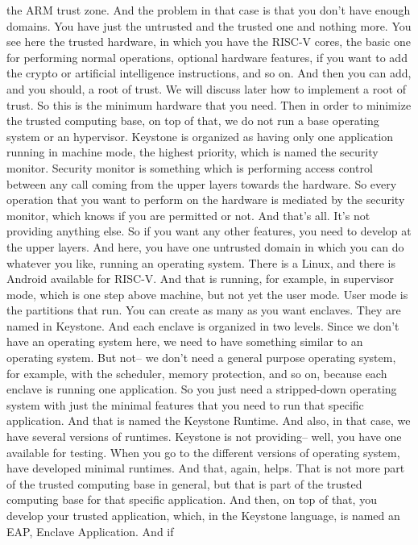  the ARM trust zone. And the problem in that case is that you don't have enough
 domains. You have just the untrusted and the trusted one and nothing more. You
 see here the trusted hardware, in which you have the RISC-V cores, the basic
 one for performing normal operations, optional hardware features, if you want
 to add the crypto or artificial intelligence instructions, and so on. And then
 you can add, and you should, a root of trust. We will discuss later how to
 implement a root of trust. So this is the minimum hardware that you need. Then
 in order to minimize the trusted computing base, on top of that, we do not run
 a base operating system or an hypervisor. Keystone is organized as having only
 one application running in machine mode, the highest priority, which is named
 the security monitor. Security monitor is something which is performing access
 control between any call coming from the upper layers towards the hardware. So
 every operation that you want to perform on the hardware is mediated by the
 security monitor, which knows if you are permitted or not. And that's all.
 It's not providing anything else. So if you want any other features, you need
 to develop at the upper layers. And here, you have one untrusted domain in
 which you can do whatever you like, running an operating system. There is a
 Linux, and there is Android available for RISC-V. And that is running, for
 example, in supervisor mode, which is one step above machine, but not yet the
 user mode. User mode is the partitions that run. You can create as many as you
 want enclaves. They are named in Keystone. And each enclave is organized in
 two levels. Since we don't have an operating system here, we need to have
 something similar to an operating system. But not-- we don't need a general
 purpose operating system, for example, with the scheduler, memory protection,
 and so on, because each enclave is running one application. So you just need a
 stripped-down operating system with just the minimal features that you need to
 run that specific application. And that is named the Keystone Runtime. And
 also, in that case, we have several versions of runtimes. Keystone is not
 providing-- well, you have one available for testing. When you go to the
 different versions of operating system, have developed minimal runtimes. And
 that, again, helps. That is not more part of the trusted computing base in
 general, but that is part of the trusted computing base for that specific
 application. And then, on top of that, you develop your trusted application,
 which, in the Keystone language, is named an EAP, Enclave Application. And if
